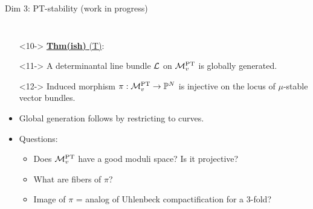 \documentclass[8pt,handout]{beamer} %
\begin{document}
\begin{frame}{Dim 3: PT-stability (work in progress)}
\begin{columns}[t]
        \begin{itemize}
            \item[]<10-> \underline{\textbf{Thm(ish)} (T)}: 
                \item[]<11-> A determinantal line bundle $\mathcal{L}$ on $\mathcal{M}^{\text{PT}}_v$ is globally generated.
                \item[]<12-> Induced morphism $\pi: \mathcal{M}^{\text{PT}}_v \to \mathbb{P}^N$ is injective on the locus of $\mu$-stable vector bundles.
            \item[]
            \item<13-> Global generation follows by restricting to curves.
            \item<14-> Questions:
            \begin{itemize}
                \item<15-> Does $\mathcal{M}^{\text{PT}}_v$ have a good moduli space? Is it projective?
                \item<16-> What are fibers of $\pi$?
                \item<17-> Image of $\pi$ = analog of Uhlenbeck compactification for a 3-fold?
            \end{itemize}
            
        \end{itemize}
    \end{columns}
\end{frame}
\end{document}
